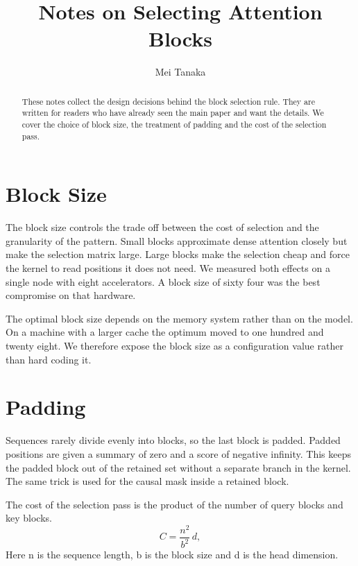 \documentclass[11pt,a4paper]{article}
\title{Notes on Selecting Attention Blocks}
\author{Mei Tanaka}
\date{}
\newcommand{\s}[1]{#1}
\begin{document}
\maketitle

\begin{abstract}
\s{These notes collect the design decisions behind the block selection rule.}
\s{They are written for readers who have already seen the main paper and want the details.}
\s{We cover the choice of block size, the treatment of padding and the cost of the selection pass.}
\end{abstract}

\section{Block Size}

\s{The block size controls the trade off between the cost of selection and the granularity of the pattern.}
\s{Small blocks approximate dense attention closely but make the selection matrix large.}
\s{Large blocks make the selection cheap and force the kernel to read positions it does not need.}
\s{We measured both effects on a single node with eight accelerators.}
\s{A block size of sixty four was the best compromise on that hardware.}

\s{The optimal block size depends on the memory system rather than on the model.}
\s{On a machine with a larger cache the optimum moved to one hundred and twenty eight.}
\s{We therefore expose the block size as a configuration value rather than hard coding it.}

\section{Padding}

\s{Sequences rarely divide evenly into blocks, so the last block is padded.}
\s{Padded positions are given a summary of zero and a score of negative infinity.}
\s{This keeps the padded block out of the retained set without a separate branch in the kernel.}
\s{The same trick is used for the causal mask inside a retained block.}

\s{The cost of the selection pass is the product of the number of query blocks and key blocks.}
\begin{equation}
  C = \frac{n^2}{b^2} \, d ,
  \label{eq:cost}
\end{equation}
\s{Here n is the sequence length, b is the block size and d is the head dimension.}
\end{document}
